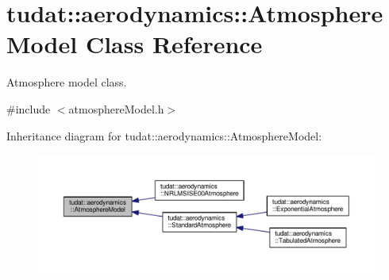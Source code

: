 \hypertarget{classtudat_1_1aerodynamics_1_1AtmosphereModel}{}\section{tudat\+:\+:aerodynamics\+:\+:Atmosphere\+Model Class Reference}
\label{classtudat_1_1aerodynamics_1_1AtmosphereModel}


Atmosphere model class.  




{\ttfamily \#include $<$atmosphere\+Model.\+h$>$}



Inheritance diagram for tudat\+:\+:aerodynamics\+:\+:Atmosphere\+Model\+:
\nopagebreak
\begin{figure}[H]
\begin{center}
\leavevmode
\includegraphics[width=350pt]{classtudat_1_1aerodynamics_1_1AtmosphereModel__inherit__graph}
\end{center}
\end{figure}
